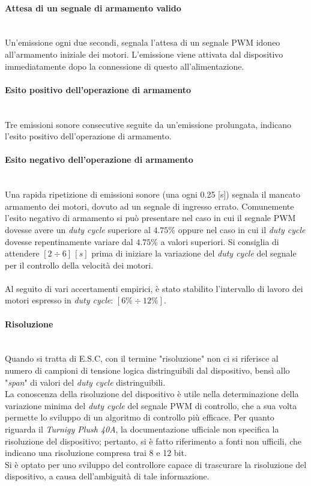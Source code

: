 \paragraph{\small{Attesa di un segnale di armamento valido}}\mbox{}\\
Un'emissione ogni due secondi, segnala l'attesa di un segnale PWM idoneo all'armamento iniziale dei motori. L'emissione viene attivata dal dispositivo immediatamente dopo la connessione di questo all'alimentazione.

\paragraph{\small{Esito positivo dell'operazione di armamento}}\mbox{}\\
Tre emissioni sonore consecutive seguite da un'emissione prolungata, indicano l'esito positivo dell'operazione di armamento.

\paragraph{\small{Esito negativo dell'operazione di armamento}}\mbox{}\\
Una rapida ripetizione di emissioni sonore (una ogni 0.25 [s]) segnala il mancato armamento dei motori, dovuto ad un segnale di ingresso errato. Comunemente l'esito negativo di armamento si può presentare 
nel caso in cui il segnale PWM dovesse avere un \textit{duty cycle} superiore al $4.75 \%$ oppure nel caso in cui il \textit{duty cycle} dovesse repentinamente variare dal $4.75 \%$ a valori superiori.
Si consiglia di attendere $[2\div 6]\, [s]$ prima di iniziare la variazione del \textit{duty cycle} del segnale per il controllo della velocità dei motori.
\\\\
Al seguito di vari accertamenti empirici, è stato stabilito l'intervallo di lavoro dei motori espresso in \textit{duty cycle}: $[6\%\div 12\%]$.

\paragraph{Risoluzione}\mbox{}\\
Quando si tratta di E.S.C, con il termine "risoluzione" non ci si riferisce al numero di campioni di tensione logica distringuibili dal dispositivo, bensì allo "\textit{span}" di valori del \textit{duty cycle} distringuibili.\\
La conoscenza della risoluzione del dispositivo è utile nella determinazione della variazione minima del \textit{duty cycle} del segnale PWM di controllo, che a sua volta permette lo sviluppo di un algoritmo di controllo più efficace.
Per quanto riguarda il \textit{Turnigy Plush 40A}, la documentazione ufficiale non specifica la risoluzione del dispositivo; pertanto, si è fatto riferimento a fonti non ufficili, che indicano una risoluzione compresa trai 8 e 12 bit.\\
Si è optato per uno sviluppo del controllore capace di trascurare la risoluzione del dispositivo, a causa dell'ambiguità di tale informazione.  




